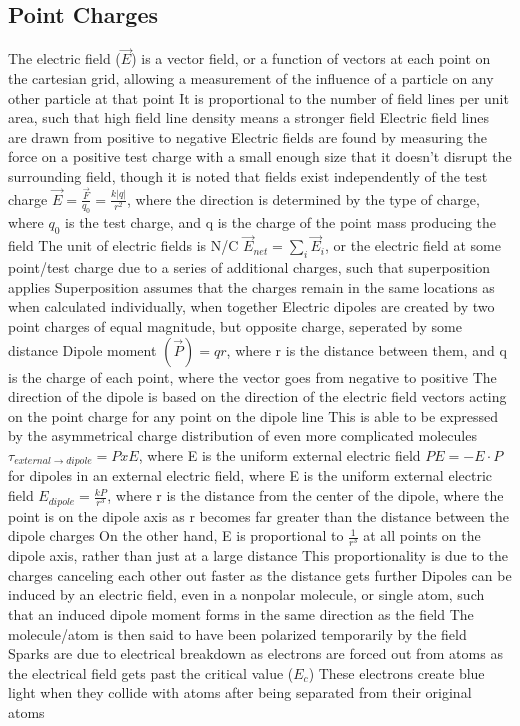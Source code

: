 \documentclass[11 pt, twoside]{article}
\newenvironment{outline*}
{
	\begin{outline}[enumerate]
	}
	{\end{outline}
}
\begin{document}
\subsection{Point Charges}
\begin{outline*}
\1 The electric field ($\vec{E}$) is a vector field, or a function of vectors at each point on the cartesian grid, allowing a measurement of the influence of a particle on any other particle at that point
\2 It is proportional to the number of field lines per unit area, such that high field line density means a stronger field
\3 Electric field lines are drawn from positive to negative
\2 Electric fields are found by measuring the force on a positive test charge with a small enough size that it doesn't disrupt the surrounding field, though it is noted that fields exist independently of the test charge
\1 $\vec{E} = \frac{\vec{F}}{q_0} = \frac{k|q|}{r^2}$, where the direction is determined by the type of charge, where $q_0$ is the test charge, and q is the charge of the point mass producing the field
\2 The unit of electric fields is N/C
\2 $\vec{E}_{net} = \sum_i \vec{E}_i$, or the electric field at some point/test charge due to a series of additional charges, such that superposition applies
\3 Superposition assumes that the charges remain in the same locations as when calculated individually, when together
\1 Electric dipoles are created by two point charges of equal magnitude, but opposite charge, seperated by some distance
\2 Dipole moment $(\vec{P}) = qr$, where r is the distance between them, and q is the charge of each point, where the vector goes from negative to positive
\3 The direction of the dipole is based on the direction of the electric field vectors acting on the point charge for any point on the dipole line
\3 This is able to be expressed by the asymmetrical charge distribution of even more complicated molecules
\2 $\tau_{external \to dipole} = P x E$, where E is the uniform external electric field
\2 $PE = -E \cdot P$ for dipoles in an external electric field, where E is the uniform external electric field
\2 $E_{dipole} = \frac{kP}{r^3}$, where r is the distance from the center of the dipole, where the point is on the dipole axis as r becomes far greater than the distance between the dipole charges
\3 On the other hand, E is proportional to $\frac{1}{r^3}$ at all points on the dipole axis, rather than just at a large distance
\3 This proportionality is due to the charges canceling each other out faster as the distance gets further
\2 Dipoles can be induced by an electric field, even in a nonpolar molecule, or single atom, such that an induced dipole moment forms in the same direction as the field
\3 The molecule/atom is then said to have been polarized temporarily by the field
\1 Sparks are due to electrical breakdown as electrons are forced out from atoms as the electrical field gets past the critical value ($E_c$)
\2 These electrons create blue light when they collide with atoms after being separated from their original atoms
\end{outline*}
\end{document}
